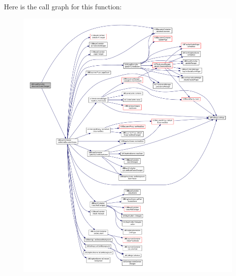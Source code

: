 Here is the call graph for this function\-:
\nopagebreak
\begin{figure}[H]
\begin{center}
\leavevmode
\includegraphics[width=350pt]{d7/d62/class_u_b_board_controller_adb6ca22449d2f5f0e8fc297c52a51f2c_cgraph}
\end{center}
\end{figure}


